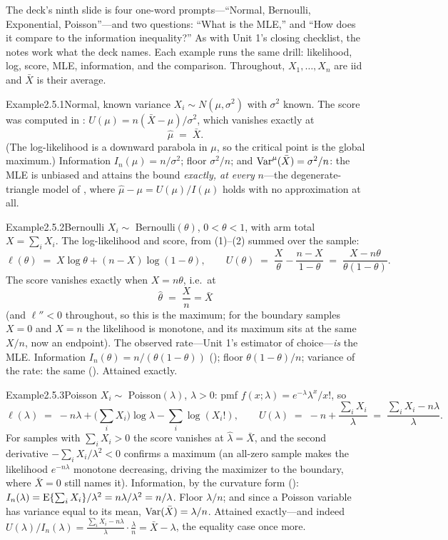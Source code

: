 \documentclass[main.tex]{subfiles}
\begin{document}
The deck's ninth slide is four one-word prompts---``Normal, Bernoulli, Exponential,
Poisson''---and two questions: ``What is the MLE,'' and ``How does it compare to the
information inequality?'' As with Unit 1's closing checklist, the notes work what the deck
names. Each example runs the same drill: likelihood, log, score, MLE, information, and the
comparison. Throughout, $X_1,\dots,X_n$ are iid and $\bar X$ is their average.

\begin{ObjL}{Example}{2.5.1}{Normal, known variance}
$X_i\sim N(\mu,\sigma^2)$ with $\sigma^2$ known. The score was computed in :
$U(\mu)=n(\bar X-\mu)/\sigma^2$, which vanishes exactly at
\[ \hat\mu \;=\; \bar X . \]
(The log-likelihood is a downward parabola in $\mu$, so the critical point is the global
maximum.) Information $I_n(\mu)=n/\sigma^2$; floor $\sigma^2/n$; and
$\operatorname{Var}^{\mu}(\bar X)=\sigma^2/n$: the MLE is unbiased and attains the bound \emph{exactly, at
every} $n$---the degenerate-triangle model of , where
$\hat\mu-\mu=U(\mu)/I(\mu)$ holds with no approximation at all.
\end{ObjL}

\begin{ObjL}{Example}{2.5.2}{Bernoulli}
$X_i\sim$ Bernoulli$(\theta)$, $0<\theta<1$, with arm total $X=\sum_i X_i$. The
log-likelihood and score, from (1)--(2) summed over the sample:
\[ \ell(\theta) \;=\; X\log\theta + (n-X)\log(1-\theta) , \qquad
   U(\theta) \;=\; \frac{X}{\theta}-\frac{n-X}{1-\theta}
   \;=\; \frac{X-n\theta}{\theta(1-\theta)} . \]
The score vanishes exactly when $X=n\theta$, i.e.\ at
\[ \hat\theta \;=\; \frac{X}{n} = \bar X \]
(and $\ell''<0$ throughout, so this is the maximum; for the boundary samples $X=0$ and
$X=n$ the likelihood is monotone, and its maximum sits at the same $X/n$, now an endpoint).
The observed rate---Unit 1's estimator of choice---\emph{is} the MLE. Information $I_n(\theta)=n/(\theta(1-\theta))$
(); floor $\theta(1-\theta)/n$; variance of the rate: the same
(). Attained exactly.
\end{ObjL}

\begin{ObjL}{Example}{2.5.3}{Poisson}
$X_i\sim$ Poisson$(\lambda)$, $\lambda>0$: pmf $f(x;\lambda)=e^{-\lambda}\lambda^x/x!$, so
\[ \ell(\lambda) \;=\; -n\lambda + \Big(\sum_i X_i\Big)\log\lambda - \sum_i \log(X_i!) ,
   \qquad
   U(\lambda) \;=\; -n + \frac{\sum_i X_i}{\lambda}
   \;=\; \frac{\sum_i X_i - n\lambda}{\lambda} . \]
For samples with $\sum_i X_i>0$ the score vanishes at $\hat\lambda=\bar X$, and the second
derivative $-\sum_i X_i/\lambda^2<0$ confirms a maximum (an all-zero sample makes the
likelihood $e^{-n\lambda}$ monotone decreasing, driving the maximizer to the boundary,
where $\bar X=0$ still names it). Information, by the curvature form
(): $I_n(\lambda)=\mathrm{E}\{\sum_i X_i\}/\lambda^2=n\lambda/\lambda^2=n/\lambda$.
Floor $\lambda/n$; and since a Poisson variable has variance equal to its mean,
$\operatorname{Var}(\bar X)=\lambda/n$. Attained exactly---and indeed
$U(\lambda)/I_n(\lambda)=\frac{\sum_i X_i-n\lambda}{\lambda}\cdot\frac{\lambda}{n}
=\bar X-\lambda$, the equality case once more.
\end{ObjL}
\end{document}
